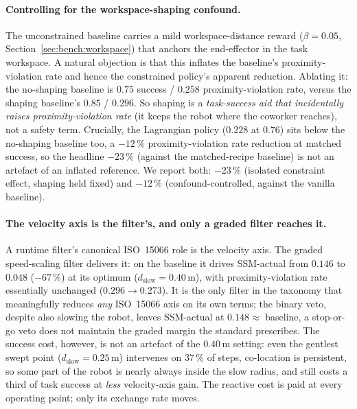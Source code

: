 \documentclass[11pt,a4paper]{report}
\newcommand{\ssm}{SSM}
\newcommand{\iso}{ISO~15066}
\begin{document}
\paragraph{Controlling for the workspace-shaping confound.}
The unconstrained baseline carries a mild workspace-distance reward
($\beta = 0.05$, Section~\ref{sec:bench:workspace}) that anchors the
end-effector in the task workspace. A natural objection is that this
inflates the baseline's proximity-violation rate and hence the constrained policy's apparent
reduction. Ablating it: the no-shaping baseline is $0.75$ success /
$0.258$ proximity-violation rate, versus the shaping baseline's $0.85$ / $0.296$. So
shaping is a \emph{task-success aid that incidentally raises
proximity-violation rate} (it keeps the robot where the coworker reaches), not a
safety term. Crucially, the Lagrangian policy ($0.228$ at $0.76$) sits
below the no-shaping baseline too, a $-12\,\%$ proximity-violation
rate reduction at
matched success, so the headline $-23\,\%$ (against the matched-recipe
baseline) is not an artefact of an inflated reference. We report both:
$-23\,\%$ (isolated constraint effect, shaping held fixed) and
$-12\,\%$ (confound-controlled, against the vanilla baseline).

\paragraph{The velocity axis is the filter's, and only a graded filter
reaches it.}
A runtime filter's canonical \iso{} role is the velocity axis. The
graded speed-scaling filter delivers it: on the baseline it drives
\ssm{}-actual from $0.146$ to $0.048$ ($-67\,\%$) at its optimum
($d_{\mathrm{slow}} = 0.40$\,m), with proximity-violation rate essentially unchanged
($0.296 \rightarrow 0.273$). It is the only filter in the taxonomy
that meaningfully reduces \emph{any} \iso{} axis on its own terms;
the binary veto, despite also slowing the robot, leaves
\ssm{}-actual at $0.148 \approx$ baseline, a stop-or-go veto does not
maintain the graded margin the standard prescribes. The success
cost, however, is not an artefact of the $0.40$\,m setting: even the
gentlest swept point ($d_{\mathrm{slow}} = 0.25$\,m) intervenes on
$37\,\%$ of steps, co-location is persistent, so some part of the
robot is nearly always inside the slow radius, and still costs a
third of task success at \emph{less} velocity-axis gain. The
reactive cost is paid at every operating point; only its exchange
rate moves.
\end{document}
